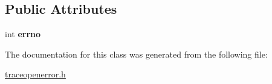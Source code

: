 \subsection*{Public Attributes}
\begin{DoxyCompactItemize}
\item 
int {\bfseries errno}\hypertarget{classTraceOpenError_a9e8f0f4ff3cb084f978e9466dcb9bf92}{}\label{classTraceOpenError_a9e8f0f4ff3cb084f978e9466dcb9bf92}

\end{DoxyCompactItemize}


The documentation for this class was generated from the following file\+:\begin{DoxyCompactItemize}
\item 
\hyperlink{traceopenerror_8h}{traceopenerror.\+h}\end{DoxyCompactItemize}
